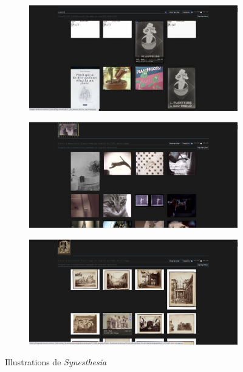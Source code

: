\begin{figure}[H]
    \centering
    \begin{subfigure}{0.8\textwidth}
        \includegraphics[width=\linewidth]{Illustrations/Synesthesia1.png}
        \caption{}
    \end{subfigure}
    \begin{subfigure}{0.8\textwidth}
        \includegraphics[width=\linewidth]{Illustrations/Synesthesia2.png}
        \caption{}
    \end{subfigure}
    \begin{subfigure}{0.8\textwidth}
        \includegraphics[width=\linewidth]{Illustrations/Synesthesia3.png}
        \caption{}
    \end{subfigure}
    \caption{Illustrations de \textit{Synesthesia}}
    \label{fig:pellicules}
\end{figure}    

